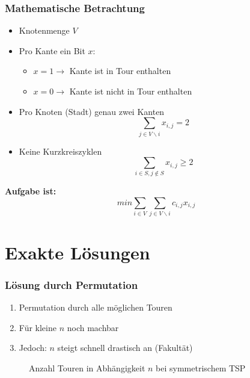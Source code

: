 \documentclass{beamer}
\begin{document}
  \begin{frame}
    \frametitle{Mathematische Betrachtung}
    \begin{itemize}
      \item Knotenmenge $V$
      \item Pro Kante ein Bit $x$:
      \begin{itemize}
        \item $x=1 \rightarrow$ Kante ist in Tour enthalten
        \item $x=0 \rightarrow$ Kante ist nicht in Tour enthalten 
      \end{itemize}
      \item
        Pro Knoten (Stadt) genau zwei Kanten
        $$\sum_{j \in V \backslash i}x_{i,j} = 2$$
      \item
        Keine Kurzkreiszyklen
        $$\sum_{i \in S, j \notin S}x_{i,j} \geq 2$$
    \end{itemize}
    \pause
    \textbf{Aufgabe ist:}
    $$min\sum_{i \in V} \sum_{j \in V \backslash i} c_{i,j}x_{i,j}$$
  \end{frame}

  \section{Exakte Lösungen}

  \begin{frame}
    \frametitle{Lösung durch Permutation}

    \begin{enumerate}[<+->]
      \item Permutation durch alle möglichen Touren
      \item Für kleine $n$ noch machbar
      \item Jedoch: $n$ steigt schnell drastisch an (Fakultät)
    \end{enumerate}

    \pause

    \begin{figure}
      \centering
      \caption{Anzahl Touren in Abhängigkeit $n$ bei symmetrischem TSP}
    \end{figure}
  \end{frame}
\end{document}
